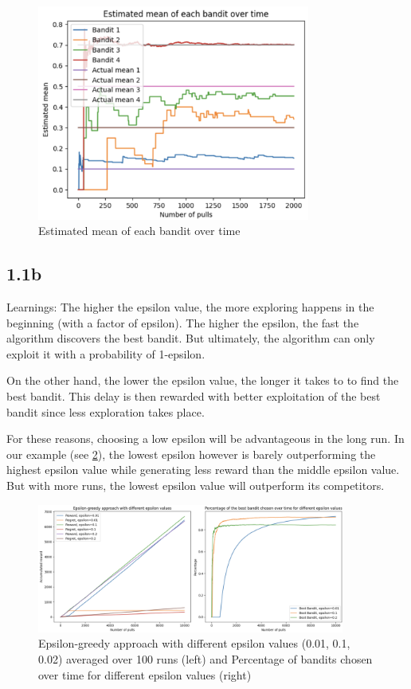 \documentclass{article} %
\begin{document}
	\begin{figure}[h!]
		\centering
		\includegraphics[width=0.8\textwidth]{images/1.1.a.2}
		\caption{Estimated mean of each bandit over time}
		\label{fig:1.1.a.2}
	\end{figure}

	\subsection{1.1b}
	
	Learnings: The higher the epsilon value, the more exploring happens in the beginning (with a factor of epsilon). The higher the epsilon, the fast the algorithm discovers the best bandit. But ultimately, the algorithm can only exploit it with a probability of 1-epsilon. 
	
	On the other hand, the lower the epsilon value, the longer it takes to to find the best bandit. This delay is then rewarded with better exploitation of the best bandit since less exploration takes place. 
	
	For these reasons, choosing a low epsilon will be advantageous in the long run. In our example (see \ref{fig:1.1.b}), the lowest epsilon however is barely outperforming the highest epsilon value while generating less reward than the middle epsilon value. But with more runs, the lowest epsilon value will outperform its competitors. 
	
	\begin{figure}[h!]
		\centering
		\includegraphics[width=0.9\textwidth]{images/1.1.b}
		\caption{Epsilon-greedy approach with different epsilon values (0.01, 0.1, 0.02) averaged over 100 runs (left) and Percentage of bandits chosen over time for different epsilon values (right)}
		\label{fig:1.1.b}
	\end{figure}
	
\end{document}

